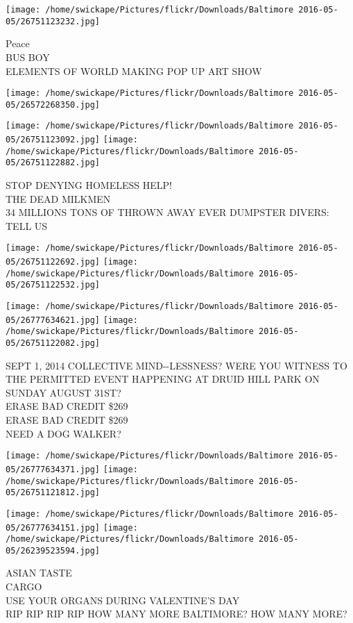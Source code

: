 \documentclass[10pt,letterpaper]{article}
\begin{document}
\texttt{[image: /home/swickape/Pictures/flickr/Downloads/Baltimore 2016-05-05/26751123232.jpg]}

Peace\\
BUS BOY\\
ELEMENTS OF WORLD MAKING POP UP ART SHOW
\pagebreak

\texttt{[image: /home/swickape/Pictures/flickr/Downloads/Baltimore 2016-05-05/26572268350.jpg]}

\vspace{0.25in}
\texttt{[image: /home/swickape/Pictures/flickr/Downloads/Baltimore 2016-05-05/26751123092.jpg]}
\texttt{[image: /home/swickape/Pictures/flickr/Downloads/Baltimore 2016-05-05/26751122882.jpg]}

STOP DENYING HOMELESS HELP!\\
THE DEAD MILKMEN\\
34 MILLIONS TONS OF THROWN AWAY EVER DUMPSTER DIVERS: TELL US
\pagebreak

\texttt{[image: /home/swickape/Pictures/flickr/Downloads/Baltimore 2016-05-05/26751122692.jpg]}
\texttt{[image: /home/swickape/Pictures/flickr/Downloads/Baltimore 2016-05-05/26751122532.jpg]}

\texttt{[image: /home/swickape/Pictures/flickr/Downloads/Baltimore 2016-05-05/26777634621.jpg]}
\texttt{[image: /home/swickape/Pictures/flickr/Downloads/Baltimore 2016-05-05/26751122082.jpg]}

SEPT 1, 2014 COLLECTIVE MIND{-}{-}LESSNESS?  WERE YOU WITNESS TO THE PERMITTED EVENT HAPPENING AT DRUID HILL PARK ON SUNDAY AUGUST 31ST?\\
ERASE BAD CREDIT \$269\\
ERASE BAD CREDIT \$269\\
NEED A DOG WALKER?
\pagebreak

\texttt{[image: /home/swickape/Pictures/flickr/Downloads/Baltimore 2016-05-05/26777634371.jpg]}
\texttt{[image: /home/swickape/Pictures/flickr/Downloads/Baltimore 2016-05-05/26751121812.jpg]}

\texttt{[image: /home/swickape/Pictures/flickr/Downloads/Baltimore 2016-05-05/26777634151.jpg]}
\texttt{[image: /home/swickape/Pictures/flickr/Downloads/Baltimore 2016-05-05/26239523594.jpg]}

ASIAN TASTE\\
CARGO\\
USE YOUR ORGANS DURING VALENTINE'S DAY\\
RIP RIP RIP RIP HOW MANY MORE BALTIMORE?  HOW MANY MORE?
\pagebreak
\end{document}
